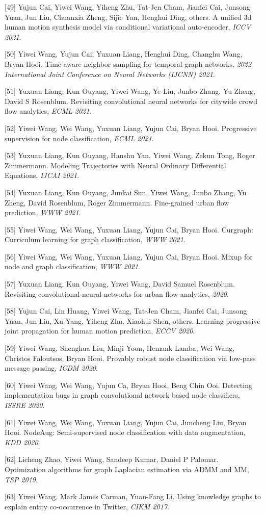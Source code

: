 [49] Yujun Cai, Yiwei Wang, Yiheng Zhu, Tat-Jen Cham, Jianfei Cai, Junsong Yuan, Jun Liu, Chuanxia Zheng, Sijie Yan, Henghui Ding, others. A unified 3d human motion synthesis model via conditional variational auto-encoder, \textit{ICCV 2021}.

[50] Yiwei Wang, Yujun Cai, Yuxuan Liang, Henghui Ding, Changhu Wang, Bryan Hooi. Time-aware neighbor sampling for temporal graph networks, \textit{2022 International Joint Conference on Neural Networks (IJCNN) 2021}.

[51] Yuxuan Liang, Kun Ouyang, Yiwei Wang, Ye Liu, Junbo Zhang, Yu Zheng, David S Rosenblum. Revisiting convolutional neural networks for citywide crowd flow analytics, \textit{ECML 2021}.

[52] Yiwei Wang, Wei Wang, Yuxuan Liang, Yujun Cai, Bryan Hooi. Progressive supervision for node classification, \textit{ECML 2021}.

[53] Yuxuan Liang, Kun Ouyang, Hanshu Yan, Yiwei Wang, Zekun Tong, Roger Zimmermann. Modeling Trajectories with Neural Ordinary Differential Equations, \textit{IJCAI 2021}.

[54] Yuxuan Liang, Kun Ouyang, Junkai Sun, Yiwei Wang, Junbo Zhang, Yu Zheng, David Rosenblum, Roger Zimmermann. Fine-grained urban flow prediction, \textit{WWW 2021}.

[55] Yiwei Wang, Wei Wang, Yuxuan Liang, Yujun Cai, Bryan Hooi. Curgraph: Curriculum learning for graph classification, \textit{WWW 2021}.

[56] Yiwei Wang, Wei Wang, Yuxuan Liang, Yujun Cai, Bryan Hooi. Mixup for node and graph classification, \textit{WWW 2021}.

[57] Yuxuan Liang, Kun Ouyang, Yiwei Wang, David Samuel Rosenblum. Revisiting convolutional neural networks for urban flow analytics, \textit{ 2020}.

[58] Yujun Cai, Lin Huang, Yiwei Wang, Tat-Jen Cham, Jianfei Cai, Junsong Yuan, Jun Liu, Xu Yang, Yiheng Zhu, Xiaohui Shen, others. Learning progressive joint propagation for human motion prediction, \textit{ECCV 2020}.

[59] Yiwei Wang, Shenghua Liu, Minji Yoon, Hemank Lamba, Wei Wang, Christos Faloutsos, Bryan Hooi. Provably robust node classification via low-pass message passing, \textit{ICDM 2020}.

[60] Yiwei Wang, Wei Wang, Yujun Ca, Bryan Hooi, Beng Chin Ooi. Detecting implementation bugs in graph convolutional network based node classifiers, \textit{ISSRE 2020}.

[61] Yiwei Wang, Wei Wang, Yuxuan Liang, Yujun Cai, Juncheng Liu, Bryan Hooi. NodeAug: Semi-supervised node classification with data augmentation, \textit{KDD 2020}.

[62] Licheng Zhao, Yiwei Wang, Sandeep Kumar, Daniel P Palomar. Optimization algorithms for graph Laplacian estimation via ADMM and MM, \textit{TSP 2019}.

[63] Yiwei Wang, Mark James Carman, Yuan-Fang Li. Using knowledge graphs to explain entity co-occurrence in Twitter, \textit{CIKM 2017}.